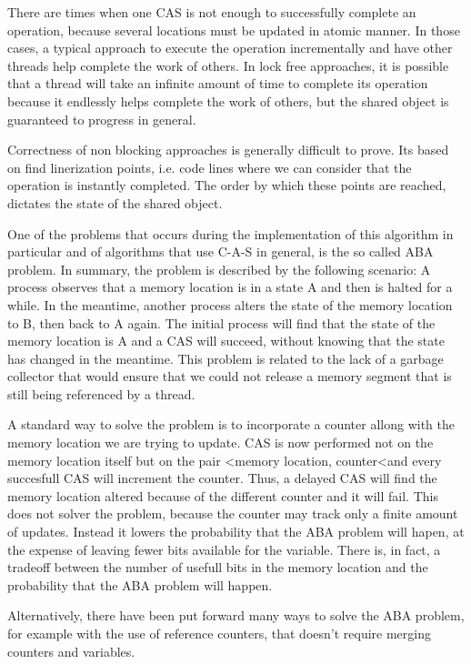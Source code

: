 There are times when one CAS is not enough to successfully complete an operation, because several locations must be updated in atomic manner. In those cases, a typical approach to execute the operation  incrementally and have other threads help complete the work of others. In lock free approaches, it is possible that a thread will take an infinite amount of time to complete its operation because it endlessly helps complete the work of others, but the shared object is guaranteed to progress in general.

Correctness of non blocking approaches is  generally difficult to prove. Its based on find linerization points, i.e. code lines where we can consider that the operation is instantly completed. The order by which these points are reached, dictates the state of the shared object.


One of the problems that occurs during the implementation of this algorithm in particular and of algorithms that use C-A-S in general, is the so called ABA problem. In summary, the problem is described by the following scenario: A process observes that a memory location is in a state A and then is halted for a while. In the meantime, another process alters the state of the memory location to B, then back to A again. The initial process will find that the state of the memory location is A and a CAS will succeed, without knowing that the state has changed in the meantime. This problem is related to the lack of a garbage collector that would ensure that we could not release a memory segment that is still being referenced by a thread.

A standard way to solve the problem is to incorporate a counter allong with the memory location we are trying to update. CAS is now performed not on the memory location itself but on the pair \textless memory location, counter\textless and every succesfull CAS will increment the counter. Thus, a delayed CAS will find the memory location altered because of the different counter and it will fail. This does not solver the problem, because the counter may track only a finite amount of updates. Instead it lowers the probability that the ABA problem will hapen, at the expense of leaving fewer bits available for the variable. There is, in fact, a tradeoff between the number of usefull bits in the memory location and the probability that the ABA problem will happen.


Alternatively,  there have been put forward many ways to solve the ABA problem, for example with the use of reference counters, that doesn't require merging counters and variables.

